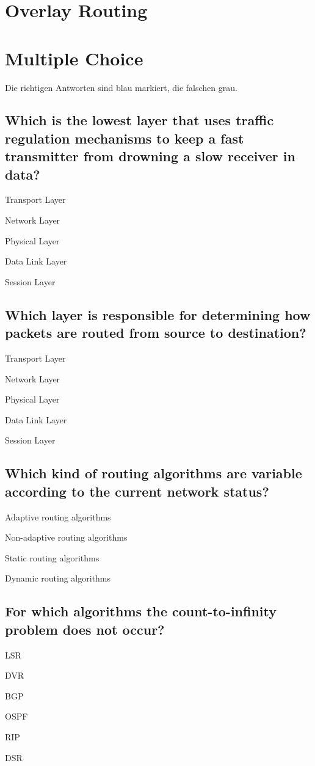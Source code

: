 \documentclass[a4paper,
			llpt,
			solution,
			accentcolor=tud2d,
			colorbacktitle
			]
			{tudexercise}
\newcommand{\8}{$\infty$}
\begin{document}
\section{Overlay Routing}
\section{Multiple Choice}
Die richtigen Antworten sind \textcolor{tud2d}{blau} markiert, die falschen \textcolor{litegray}{grau}.
\subsection{Which is the lowest layer that uses traffic regulation mechanisms to keep a fast transmitter from drowning a slow receiver in data?}
\begin{compactenum}
\item Transport Layer
\item Network Layer
\item Physical Layer
\item Data Link Layer
\item Session Layer
\end{compactenum}
\subsection{Which layer is responsible for determining how packets are routed from source to destination?}
\begin{compactenum}
\item Transport Layer
\item Network Layer
\item Physical Layer
\item Data Link Layer
\item Session Layer
\end{compactenum}
\subsection{Which kind of routing algorithms are variable according to the current network status?}
\begin{compactenum}
\item Adaptive routing algorithms
\item Non-adaptive routing algorithms
\item Static routing algorithms
\item Dynamic routing algorithms
\end{compactenum}
\subsection{For which algorithms the count-to-infinity problem does not occur?}
\begin{compactenum}
\item LSR
\item DVR
\item BGP
\item OSPF
\item RIP
\item DSR
\end{compactenum}
\end{document}
